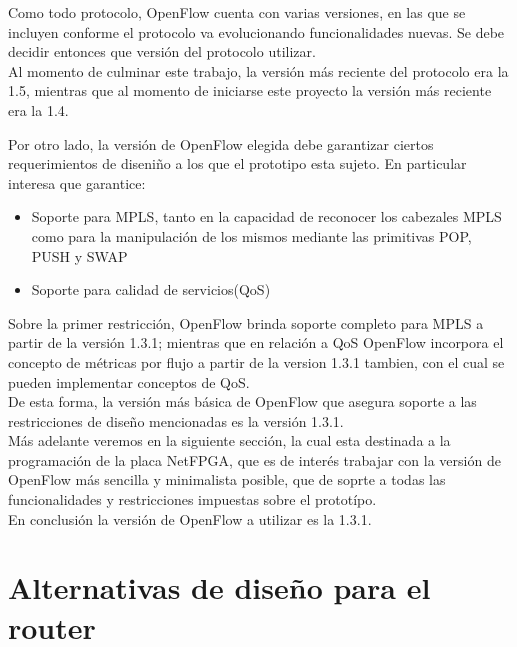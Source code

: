 
Como todo protocolo, OpenFlow cuenta con varias versiones, en las que se incluyen conforme el protocolo va evolucionando funcionalidades nuevas. Se debe decidir entonces que versi\'on del protocolo utilizar.\\

Al momento de culminar este trabajo, la versi\'on m\'as reciente del protocolo era la 1.5, mientras que al momento de iniciarse este proyecto la versi\'on m\'as reciente era la 1.4. 

Por otro lado, la versi\'on de OpenFlow elegida debe garantizar ciertos requerimientos de diseni\~no a los que el prototipo esta sujeto. En particular interesa que garantice:

\begin{itemize}
\item Soporte para MPLS, tanto en la capacidad de reconocer los cabezales MPLS como para la manipulaci\'on de los mismos mediante las primitivas POP, PUSH y SWAP
\item Soporte para calidad de servicios(QoS)
\end{itemize}

Sobre la primer restricci\'on, OpenFlow brinda soporte completo para MPLS a partir de la versi\'on 1.3.1; mientras que en relaci\'on a QoS OpenFlow incorpora el concepto de métricas por flujo a partir de la version 1.3.1 tambien, con el cual se pueden implementar conceptos de QoS.\\

De esta forma, la versi\'on m\'as b\'asica de OpenFlow que asegura soporte a las restricciones de dise\~no mencionadas es la versi\'on 1.3.1.\\

M\'as adelante veremos en la siguiente secci\'on, la cual  esta destinada a la programaci\'on de la placa NetFPGA, que es de inter\'es trabajar con la versi\'on de OpenFlow m\'as sencilla y minimalista posible, que de soprte a todas las funcionalidades y restricciones impuestas sobre el protot\'ipo.\\ 

En conclusi\'on la versi\'on de OpenFlow a utilizar es la 1.3.1.

\section[Alternativas de dise\~no para el router]{Alternativas de dise\~no para el router}

